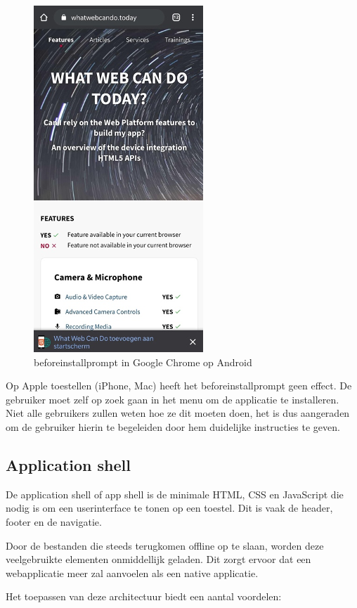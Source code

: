 	\begin{figure}[H]
		\centering
		\includegraphics{./img/beforeinstallprompt_android.png}
		\caption{beforeinstallprompt in Google Chrome op Android}
	\end{figure}
	
	Op Apple toestellen (iPhone, Mac) heeft het beforeinstallprompt geen effect. De gebruiker moet zelf op zoek gaan in het menu om de applicatie te installeren.
	Niet alle gebruikers zullen weten hoe ze dit moeten doen, het is dus aangeraden om de gebruiker hierin te begeleiden door hem duidelijke instructies te geven.
	\autocite{PWAbuilder2020}


\subsection{Application shell}
	De application shell of app shell is de minimale HTML, CSS en JavaScript die nodig is om een userinterface te tonen op een toestel. Dit is vaak de header, footer en de navigatie.
	
	Door de bestanden die steeds terugkomen offline op te slaan, worden deze veelgebruikte elementen onmiddellijk geladen. Dit zorgt ervoor dat een webapplicatie meer zal aanvoelen als een native applicatie.
	
	Het toepassen van deze architectuur biedt een aantal voordelen:
	
